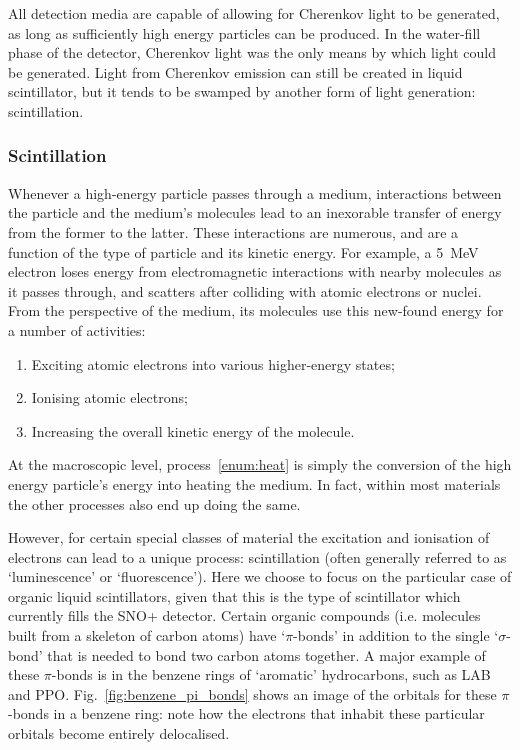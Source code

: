 All detection media are capable of allowing for Cherenkov light to be generated, as long as sufficiently high energy particles can be produced. In the water-fill phase of the detector, Cherenkov light was the only means by which light could be generated. Light from Cherenkov emission can still be created in liquid scintillator, but it tends to be swamped by another form of light generation: scintillation.
\subsubsection{Scintillation}\label{sec:scintillation}
Whenever a high-energy particle passes through a medium, interactions between the particle and the medium's molecules lead to an inexorable transfer of energy from the former to the latter. These interactions are numerous, and are a function of the type of particle and its kinetic energy. For example, a \SI{5}{\MeV} electron loses energy from electromagnetic interactions with nearby molecules as it passes through, and scatters after colliding with atomic electrons or nuclei. From the perspective of the medium, its molecules use this new-found energy for a number of activities:
\begin{enumerate}
    \item Exciting atomic electrons into various higher-energy states;
    \item Ionising atomic electrons;
    \item Increasing the overall kinetic energy of the molecule.\label{enum:heat}
\end{enumerate}
At the macroscopic level, process~\ref{enum:heat} is simply the conversion of the high energy particle's energy into heating the medium. In fact, within most materials the other processes also end up doing the same.

However, for certain special classes of material the excitation and ionisation of electrons can lead to a unique process: scintillation (often generally referred to as `luminescence' or `fluorescence'). Here we choose to focus on the particular case of organic liquid scintillators, given that this is the type of scintillator which currently fills the SNO+ detector. Certain organic compounds (i.e. molecules built from a skeleton of carbon atoms) have `$\pi$-bonds' in addition to the single `$\sigma$-bond' that is needed to bond two carbon atoms together. A major example of these $\pi$-bonds is in the benzene rings of `aromatic' hydrocarbons, such as LAB and PPO. Fig.~\ref{fig:benzene_pi_bonds} shows an image of the orbitals for these $\pi$-bonds in a benzene ring: note how the electrons that inhabit these particular orbitals become entirely delocalised.

